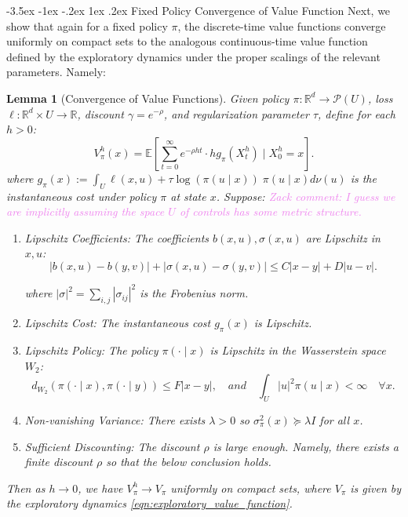 \documentclass[11pt,oneside,reqno]{article}
\makeatletter
\theoremstyle{plain}
\newtheorem{lemma}[theorem]{Lemma}
\theoremstyle{definition}
\numberwithin{equation}{section}
\def\subsection#1{\@startsection {subsection}{2}{0pt}%
{-3.5ex \@plus -1ex \@minus -.2ex}%
{1ex \@plus.2ex}%
{\bf\mathversion{bold}}{#1}}
\renewcommand{\leq}{\leqslant}
\newcommand{\R}{\mathbb{R}}
\newcommand{\E}{\mathbb{E}}
\newcommand{\zack}[1]{\textcolor{Violet}{Zack comment: #1}}
\makeatother
\begin{document}
\subsection{Fixed Policy Convergence of Value Function}
\noindent Next, we show that again for a fixed policy $\pi$, the discrete-time value functions converge uniformly on compact sets
to the analogous continuous-time value function defined by the exploratory dynamics under the proper scalings of the relevant parameters. Namely:
%
\begin{lemma}[Convergence of Value Functions]
	Given policy $\pi: \R^d \to \mathcal{P}(U)$, loss $\ell: \R^d \times U \to \R$, discount $\gamma = e^{-\rho}$, and regularization parameter $\tau$, define for each $h > 0$:
	\[V^h_\pi(x) = \E\left[ \sum_{t=0}^\infty e^{-\rho h t} \cdot h g_\pi(X^h_t)\;\bigg\vert\; X^h_0 = x\right].\]
	\noindent where $g_\pi(x) := \int_U \ell(x, u) + \tau \log(\pi(u \mid x)) \; \pi(u \mid x) d\nu(u)$ is the instantaneous cost under policy $\pi$ at state $x$.
	\noindent Suppose: \zack{I guess we are implicitly assuming the space $U$ of controls has some metric structure.}

	\begin{enumerate}[label=(\roman*)]
		\item \textit{Lipschitz Coefficients:} The coefficients $b(x, u), \sigma(x,u)$ are Lipschitz in $x,u$:
		       \[|b(x,u) - b(y,v)| + |\sigma(x,u) - \sigma(y,v)|  \leq C |x-y| + D |u-v|.\]

			   \noindent where $|\sigma|^2 = \sum_{i,j} |\sigma_{ij}|^2$ is the Frobenius norm.
		\item \textit{Lipschitz Cost:} The instantaneous cost $g_\pi(x)$ is Lipschitz. 
		\item \textit{Lipschitz Policy:} The policy $\pi(\cdot \mid x)$ is Lipschitz in the Wasserstein space $W_2$:
				\[d_{W_2}(\pi(\cdot \mid x), \pi(\cdot \mid y)) \leq F |x-y|, \quad and \quad \int_U |u|^2 \pi(u \mid x) < \infty \quad \forall x.\]
		\item \textit{Non-vanishing Variance}: There exists $\lambda > 0$ so $\sigma_\pi^2(x) \succeq \lambda I$ for all $x$. 


		\item \textit{Sufficient Discounting:} The discount $\rho$ is large enough. Namely, there exists a finite discount $\rho$ so that the below conclusion holds.

		
	\end{enumerate}
	
	\noindent Then as $h \to 0$, we have $V^h_\pi \to V_\pi$ uniformly on compact sets, where $V_\pi$ is given by the exploratory dynamics \eqref{eqn:exploratory_value_function}. 
	\label{lem:convergence_of_value_functions}
\end{lemma}
\end{document}
